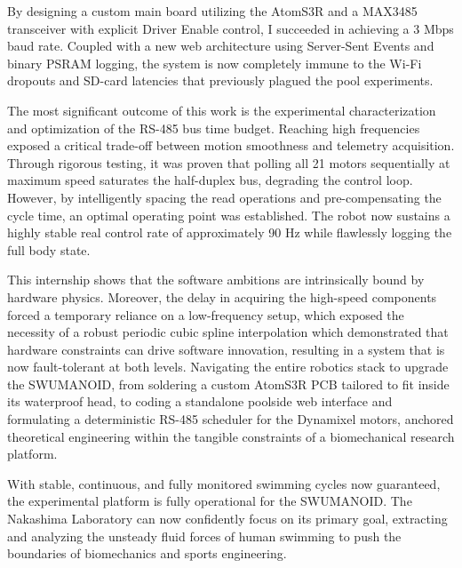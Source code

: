 \documentclass{tropLaClasse}
\begin{document}
By designing a custom main board utilizing the AtomS3R and a MAX3485 transceiver with explicit Driver Enable control, I succeeded in achieving a 3 Mbps baud rate. Coupled with a new web architecture using Server-Sent Events and binary PSRAM logging, the system is now completely immune to the Wi-Fi dropouts and SD-card latencies that previously plagued the pool experiments.

The most significant outcome of this work is the experimental characterization and optimization of the RS-485 bus time budget. Reaching high frequencies exposed a critical trade-off between motion smoothness and telemetry acquisition. Through rigorous testing, it was proven that polling all 21 motors sequentially at maximum speed saturates the half-duplex bus, degrading the control loop. However, by intelligently spacing the read operations and pre-compensating the cycle time, an optimal operating point was established. The robot now sustains a highly stable real control rate of approximately 90 Hz while flawlessly logging the full body state.

This internship shows that the software ambitions are intrinsically bound by hardware physics. Moreover, the delay in acquiring the high-speed components forced a temporary reliance on a low-frequency setup, which exposed the necessity of a robust periodic cubic spline interpolation which demonstrated that hardware constraints can drive software innovation, resulting in a system that is now fault-tolerant at both levels. Navigating the entire robotics stack to upgrade the SWUMANOID, from soldering a custom AtomS3R PCB tailored to fit inside its waterproof head, to coding a standalone poolside web interface and formulating a deterministic RS-485 scheduler for the Dynamixel motors, anchored theoretical engineering within the tangible constraints of a biomechanical research platform.

With stable, continuous, and fully monitored swimming cycles now guaranteed, the experimental platform is fully operational for the SWUMANOID. The Nakashima Laboratory can now confidently focus on its primary goal, extracting and analyzing the unsteady fluid forces of human swimming to push the boundaries of biomechanics and sports engineering.



\clearpage

\renewcommand{\refname}{\vspace{-4ex}}
\end{document}

